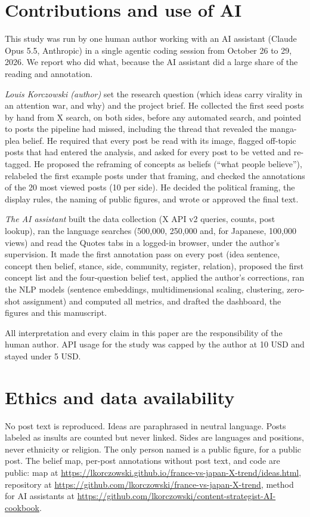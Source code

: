 \documentclass[10pt,a4paper]{article}
\begin{document}
\section{Contributions and use of AI}
\label{sec:contrib}
This study was run by one human author working with an AI assistant (Claude Opus 5.5, Anthropic) in a single agentic coding session from October 26 to 29, 2026. We report who did what, because the AI assistant did a large share of the reading and annotation.

\emph{Louis Korczowski (author)} set the research question (which ideas carry virality in an attention war, and why) and the project brief. He collected the first seed posts by hand from X search, on both sides, before any automated search, and pointed to posts the pipeline had missed, including the thread that revealed the manga-plea belief. He required that every post be read with its image, flagged off-topic posts that had entered the analysis, and asked for every post to be vetted and re-tagged. He proposed the reframing of concepts as beliefs (``what people believe''), relabeled the first example posts under that framing, and checked the annotations of the 20 most viewed posts (10 per side). He decided the political framing, the display rules, the naming of public figures, and wrote or approved the final text.

\emph{The AI assistant} built the data collection (X API v2 queries, counts, post lookup), ran the language searches (500,000, 250,000 and, for Japanese, 100,000 views) and read the Quotes tabs in a logged-in browser, under the author's supervision. It made the first annotation pass on every post (idea sentence, concept then belief, stance, side, community, register, relation), proposed the first concept list and the four-question belief test, applied the author's corrections, ran the NLP models (sentence embeddings, multidimensional scaling, clustering, zero-shot assignment) and computed all metrics, and drafted the dashboard, the figures and this manuscript.

All interpretation and every claim in this paper are the responsibility of the human author. API usage for the study was capped by the author at 10 USD and stayed under 5 USD.

\section{Ethics and data availability}
No post text is reproduced. Ideas are paraphrased in neutral language. Posts labeled as insults are counted but never linked. Sides are languages and positions, never ethnicity or religion. The only person named is a public figure, for a public post. The belief map, per-post annotations without post text, and code are public: map at \url{https://lkorczowski.github.io/france-vs-japan-X-trend/ideas.html}, repository at \url{https://github.com/lkorczowski/france-vs-japan-X-trend}, method for AI assistants at \url{https://github.com/lkorczowski/content-strategist-AI-cookbook}.
\end{document}
